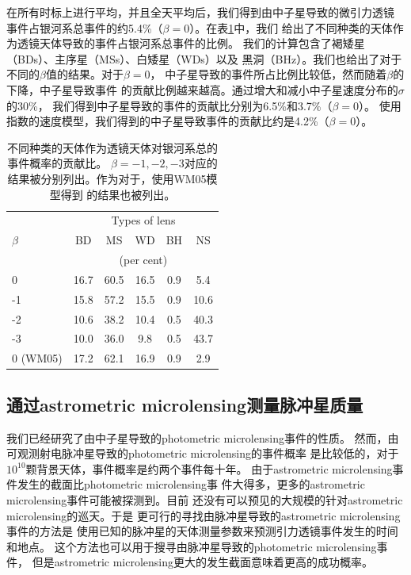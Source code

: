 在所有时标上进行平均，并且全天平均后，我们得到由中子星导致的微引力透镜
事件占银河系总事件的约5.4\%（$\beta=0$）。在表\ref{percent}中，我们
给出了不同种类的天体作为透镜天体导致的事件占银河系总事件的比例。
我们的计算包含了褐矮星（BDs）、主序星（MSs）、白矮星（WDs）以及
黑洞（BHz）。我们也给出了对于不同的$\beta$值的结果。对于$\beta=0$，
中子星导致的事件所占比例比较低，然而随着$\beta$的下降，中子星导致事件
的贡献比例越来越高。通过增大和减小中子星速度分布的$\sigma$的30\%，
我们得到中子星导致的事件的贡献比分别为6.5\%和3.7\%（$\beta=0$）。
使用指数的速度模型，我们得到的中子星导致事件的贡献比约是4.2\%（$\beta=0$）。
%
\begin{table}
\begin{center}
\caption{不同种类的天体作为透镜天体对银河系总的事件概率的贡献比。
$\beta=-1,-2,-3$对应的结果被分别列出。作为对于，使用WM05模型得到
的结果也被列出。}
\label{percent}
%
\begin{tabular}{lccccc}
\hline
             &       \multicolumn{5}{c}{Types of lens}      \\
$\beta$      & BD   &    MS    &    WD     &  BH   & NS     \\
             &       \multicolumn{5}{c}{(per cent)}         \\
\hline
0            & 16.7 &    60.5  &    16.5   &  0.9  & 5.4    \\
-1           & 15.8 &    57.2  &    15.5   &  0.9  & 10.6   \\        
-2           & 10.6 &    38.2  &    10.4   &  0.5  & 40.3   \\         
-3           & 10.0 &    36.0  &    9.8    &  0.5  & 43.7   \\            
0 (WM05)     & 17.2 &    62.1  &    16.9   &  0.9  & 2.9    \\
\hline
\end{tabular}
\end{center}
\end{table}
%
%

\subsection{通过astrometric microlensing测量脉冲星质量}

我们已经研究了由中子星导致的photometric microlensing事件的性质。
然而，由可观测射电脉冲星导致的photometric microlensing的事件概率
是比较低的，对于$10^{10}$颗背景天体，事件概率是约两个事件每十年。
由于astrometric microlensing事件发生的截面比photometric microlensing事
件大得多，更多的astrometric microlensing事件可能被探测到。目前
还没有可以预见的大规模的针对astrometric microlensing的巡天。于是
更可行的寻找由脉冲星导致的astrometric microlensing事件的方法是
使用已知的脉冲星的天体测量参数来预测引力透镜事件发生的时间和地点。
这个方法也可以用于搜寻由脉冲星导致的photometric microlensing事件，
但是astrometric microlensing更大的发生截面意味着更高的成功概率。

